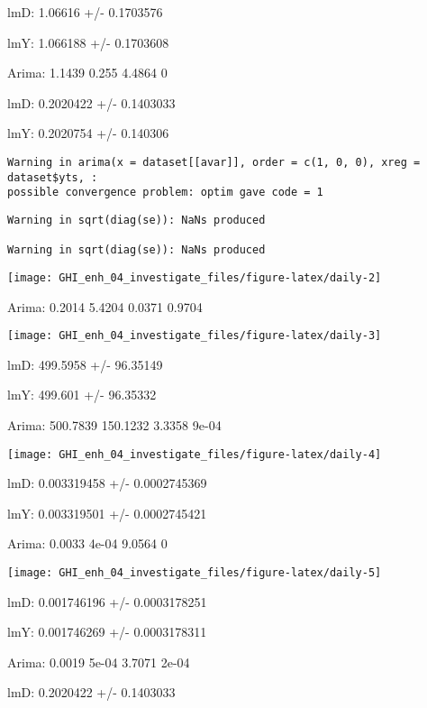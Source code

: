 \documentclass[
  10pt,
  a4paper,oneside]{article}
\begin{document}
lmD: 1.06616 +/- 0.1703576

lmY: 1.066188 +/- 0.1703608

Arima: 1.1439 0.255 4.4864 0

lmD: 0.2020422 +/- 0.1403033

lmY: 0.2020754 +/- 0.140306

\begin{verbatim}
Warning in arima(x = dataset[[avar]], order = c(1, 0, 0), xreg = dataset$yts, :
possible convergence problem: optim gave code = 1
\end{verbatim}

\begin{verbatim}
Warning in sqrt(diag(se)): NaNs produced

Warning in sqrt(diag(se)): NaNs produced
\end{verbatim}

\begin{center}\texttt{[image: GHI\_enh\_04\_investigate\_files/figure-latex/daily-2]} \end{center}

Arima: 0.2014 5.4204 0.0371 0.9704

\begin{center}\texttt{[image: GHI\_enh\_04\_investigate\_files/figure-latex/daily-3]} \end{center}

lmD: 499.5958 +/- 96.35149

lmY: 499.601 +/- 96.35332

Arima: 500.7839 150.1232 3.3358 9e-04

\begin{center}\texttt{[image: GHI\_enh\_04\_investigate\_files/figure-latex/daily-4]} \end{center}

lmD: 0.003319458 +/- 0.0002745369

lmY: 0.003319501 +/- 0.0002745421

Arima: 0.0033 4e-04 9.0564 0

\begin{center}\texttt{[image: GHI\_enh\_04\_investigate\_files/figure-latex/daily-5]} \end{center}

lmD: 0.001746196 +/- 0.0003178251

lmY: 0.001746269 +/- 0.0003178311

Arima: 0.0019 5e-04 3.7071 2e-04

lmD: 0.2020422 +/- 0.1403033
\end{document}
